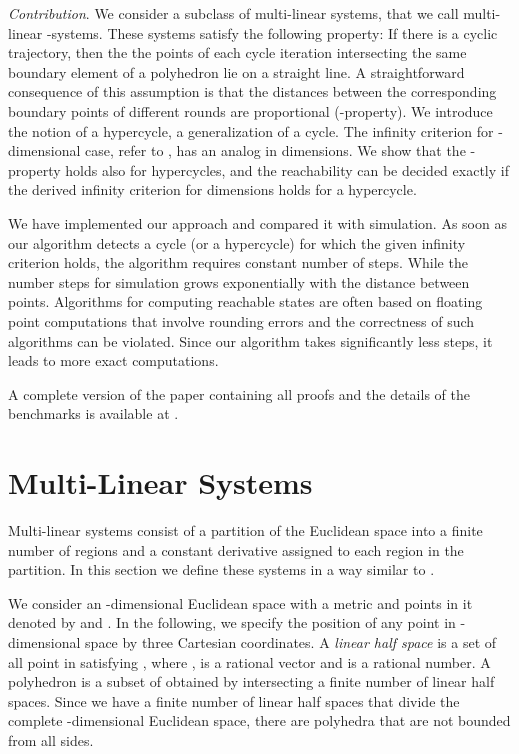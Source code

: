 \documentclass[copyright,creativecommons]{packages/eptcs}
\begin{document}
{\it Contribution}. 
We  consider  a subclass of multi-linear systems,  that we call multi-linear -systems. These systems 
 satisfy the following property: If there is a cyclic trajectory, then  the the points of each cycle iteration intersecting the same boundary element of a polyhedron lie on a straight line. A straightforward consequence of this assumption is that the distances between the corresponding boundary points of different rounds are proportional (-property). 
We  introduce the notion of a hypercycle, a generalization of a cycle. The infinity criterion for -dimensional case, refer to \cite{MP93}, has an analog in  dimensions. We show  that the -property holds also for hypercycles, and the reachability can be decided exactly if the derived infinity criterion for  dimensions holds for a hypercycle. 

We have implemented our approach and compared it with simulation.
As soon as our algorithm detects a cycle (or a hypercycle) for which the given infinity criterion holds, the algorithm requires constant number of steps. While the number steps for simulation grows exponentially with the distance between points. 
Algorithms for  computing  reachable states  are often based on floating point computations  that involve rounding errors and the correctness of such algorithms can be violated. Since our algorithm takes significantly less steps, it leads to more exact computations.  
 

A complete version of the paper containing all proofs and the details of the benchmarks is available at 
\cite{TF11-2}.

\section{Multi-Linear  Systems}\label{sec:basics}

Multi-linear systems consist of a partition of the  Euclidean space into a finite number of regions  and a constant derivative
assigned to each region in the partition. 
In this section we define these systems in a way similar to \cite{MP93}.


We consider an -dimensional Euclidean space   with a metric  and points in it denoted by  and . In the following, we  specify the position of any point in -dimensional space by three Cartesian coordinates. 
A {\em linear half space} is a set of all point in  satisfying , where ,  is a rational vector and  is a rational number.
A polyhedron is a  subset  of  obtained by  intersecting a finite number of linear half spaces. 
Since we have  a finite number of linear half spaces that divide the complete -dimensional Euclidean space, there are polyhedra that are not bounded from all sides. 
\end{document}
